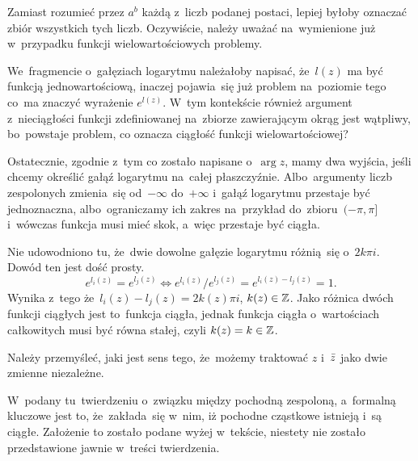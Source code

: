 \documentclass[a4paper,11pt]{article}
\begin{document}
\vspace{\spaceFour}


\start {} Zamiast rozumieć przez $a^{ b }$ każdą z~liczb podanej
postaci, lepiej byłoby oznaczać zbiór wszystkich tych liczb.
Oczywiście, należy uważać na~wymienione już w~przypadku funkcji
wielowartościowych problemy.

\vspace{\spaceFour}


\start {} We~fragmencie o~gałęziach logarytmu należałoby
napisać, że~$l( z )$ ma być funkcją jednowartościową, inaczej
pojawia~się już problem na~poziomie tego co~ma znaczyć wyrażenie
$e^{ l( z ) }$. W~tym kontekście również argument z~nieciągłości
funkcji zdefiniowanej na~zbiorze zawierającym okrąg jest wątpliwy,
bo~powstaje problem, co oznacza ciągłość funkcji wielowartościowej?

Ostatecznie, zgodnie z~tym co zostało napisane o~$\arg z$, mamy dwa
wyjścia, jeśli chcemy określić gałąź logarytmu na~całej płaszczyźnie.
Albo~argumenty liczb zespolonych zmienia~się od~$-\infty$ do~$+\infty$
i~gałąź logarytmu przestaje być jednoznaczna, albo~ograniczamy ich
zakres na~przykład do~zbioru~$( -\pi, \pi ]$ i~wówczas funkcja musi
mieć skok, a~więc przestaje być ciągła.

\vspace{\spaceFour}


\start {} Nie udowodniono tu, że~dwie dowolne gałęzie logarytmu
różnią~się o~$2 k \pi i$. Dowód ten jest dość prosty.
\begin{equation}
  \label{eq:Leja-38}
  e^{ l_{ i }( z ) } = e^{ l_{ j }( z ) }
  \iff e^{ l_{ i }( z ) } / e^{ l_{ j }( z ) } = e^{ l_{ i }( z ) - l_{ j }( z ) }
  = 1.
\end{equation}
Wynika z~tego że~$l_{ i }( z ) - l_{ j }( z ) = 2 k( z ) \pi i$,
$k( z ) \in \mathbb{Z}$. Jako różnica dwóch funkcji ciągłych jest to~funkcja
ciągła, jednak funkcja ciągła o~wartościach całkowitych musi być równa
stałej, czyli $k( z ) = k \in \mathbb{Z}$.

\vspace{\spaceFour}


\start {} Należy przemyśleć, jaki jest sens tego, że~możemy
traktować $z$ i~$\bar{ z }$ jako dwie zmienne niezależne.

\vspace{\spaceFour}


\start {} W~podany tu~twierdzeniu o~związku między pochodną
zespoloną, a~formalną kluczowe jest to, że~zakłada~się w~nim, iż
pochodne cząstkowe istnieją i~są ciągłe. Założenie to zostało podane
wyżej w~tekście, niestety nie zostało przedstawione jawnie w~treści
twierdzenia.
\end{document}
